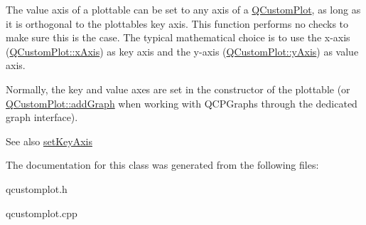 The value axis of a plottable can be set to any axis of a \hyperlink{class_q_custom_plot}{Q\+Custom\+Plot}, as long as it is orthogonal to the plottable\textquotesingle{}s key axis. This function performs no checks to make sure this is the case. The typical mathematical choice is to use the x-\/axis (\hyperlink{class_q_custom_plot_a9a79cd0158a4c7f30cbc702f0fd800e4}{Q\+Custom\+Plot\+::x\+Axis}) as key axis and the y-\/axis (\hyperlink{class_q_custom_plot_af6fea5679725b152c14facd920b19367}{Q\+Custom\+Plot\+::y\+Axis}) as value axis.

Normally, the key and value axes are set in the constructor of the plottable (or \hyperlink{class_q_custom_plot_a6fb2873d35a8a8089842d81a70a54167}{Q\+Custom\+Plot\+::add\+Graph} when working with Q\+C\+P\+Graphs through the dedicated graph interface).

\begin{DoxySeeAlso}{See also}
\hyperlink{class_q_c_p_abstract_plottable_a8524fa2994c63c0913ebd9bb2ffa3920}{set\+Key\+Axis} 
\end{DoxySeeAlso}


The documentation for this class was generated from the following files\+:\begin{DoxyCompactItemize}
\item 
qcustomplot.\+h\item 
qcustomplot.\+cpp\end{DoxyCompactItemize}

